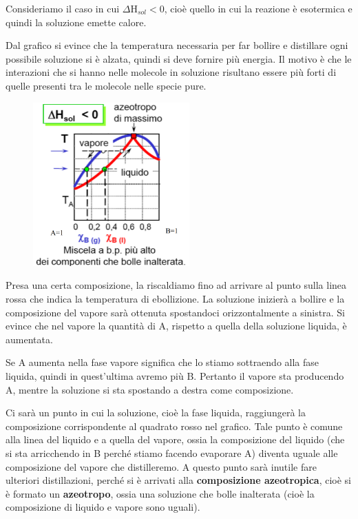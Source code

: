 \vspace{0.2cm}Consideriamo il caso in cui $\Delta$H$_{sol}$$<$0, cioè quello in cui la reazione è esotermica e quindi la soluzione emette calore.

Dal grafico si evince che la temperatura necessaria per far bollire e distillare ogni possibile soluzione si è alzata, quindi si deve fornire più energia. Il motivo è che le interazioni che si hanno nelle molecole in soluzione risultano essere più forti di quelle presenti tra le molecole nelle specie pure.

\begin{minipage}{0.395\textwidth}
    \begin{figure}[H]
        \includegraphics[width=6cm]{immagini/distillazione_esotermica.png}
    \end{figure}
\end{minipage}
\begin{minipage}{0.6\textwidth}
    \vspace{0.6cm}Presa una certa composizione, la riscaldiamo fino ad arrivare al punto sulla linea rossa che indica la temperatura di ebollizione. La soluzione inizierà a bollire e la composizione del vapore sarà ottenuta spostandoci orizzontalmente a sinistra. Si evince che nel vapore la quantità di A, rispetto a quella della soluzione liquida, è aumentata.

    Se A aumenta nella fase vapore significa che lo stiamo sottraendo alla fase liquida, quindi in quest'ultima avremo più B. Pertanto il vapore sta producendo A, mentre la soluzione si sta spostando a destra come composizione.
\end{minipage}

\vspace{0.3cm}Ci sarà un punto in cui la soluzione, cioè la fase liquida, raggiungerà la composizione corrispondente al quadrato rosso nel grafico. Tale punto è comune alla linea del liquido e a quella del vapore, ossia la composizione del liquido (che si sta arricchendo in B perché stiamo facendo evaporare A) diventa uguale alle composizione del vapore che distilleremo. A questo punto sarà inutile fare ulteriori distillazioni, perché si è arrivati alla \textbf{composizione azeotropica}, cioè si è formato un \textbf{azeotropo}, ossia una soluzione che bolle inalterata (cioè la composizione di liquido e vapore sono uguali).

